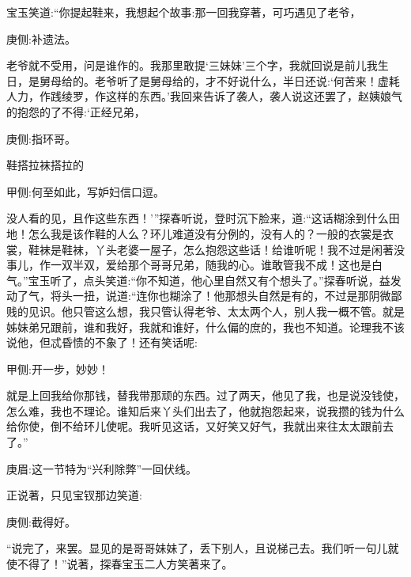 \begin{parag}
    宝玉笑道:“你提起鞋来，我想起个故事:那一回我穿著，可巧遇见了老爷，\begin{note}庚侧:补遗法。\end{note}老爷就不受用，问是谁作的。我那里敢提‘三妹妹’三个字，我就回说是前儿我生日，是舅母给的。老爷听了是舅母给的，才不好说什么，半日还说:‘何苦来！虚耗人力，作践绫罗，作这样的东西。’我回来告诉了袭人，袭人说这还罢了，赵姨娘气的抱怨的了不得:‘正经兄弟，\begin{note}庚侧:指环哥。\end{note}鞋搭拉袜搭拉的\begin{note}甲侧:何至如此，写妒妇信口逗。\end{note}没人看的见，且作这些东西！’”探春听说，登时沉下脸来，道:“这话糊涂到什么田地！怎么我是该作鞋的人么？环儿难道没有分例的，没有人的？一般的衣裳是衣裳，鞋袜是鞋袜，丫头老婆一屋子，怎么抱怨这些话！给谁听呢！我不过是闲著没事儿，作一双半双，爱给那个哥哥兄弟，随我的心。谁敢管我不成！这也是白气。”宝玉听了，点头笑道:“你不知道，他心里自然又有个想头了。”探春听说，益发动了气，将头一扭，说道:“连你也糊涂了！他那想头自然是有的，不过是那阴微鄙贱的见识。他只管这么想，我只管认得老爷、太太两个人，别人我一概不管。就是姊妹弟兄跟前，谁和我好，我就和谁好，什么偏的庶的，我也不知道。论理我不该说他，但忒昏愦的不象了！还有笑话呢:\begin{note}甲侧:开一步，妙妙！\end{note}就是上回我给你那钱，替我带那顽的东西。过了两天，他见了我，也是说没钱使，怎么难，我也不理论。谁知后来丫头们出去了，他就抱怨起来，说我攒的钱为什么给你使，倒不给环儿使呢。我听见这话，又好笑又好气，我就出来往太太跟前去了。”\begin{note}庚眉:这一节特为“兴利除弊”一回伏线。\end{note}正说著，只见宝钗那边笑道:\begin{note}庚侧:截得好。\end{note}“说完了，来罢。显见的是哥哥妹妹了，丢下别人，且说梯己去。我们听一句儿就使不得了！”说著，探春宝玉二人方笑著来了。
\end{parag}


